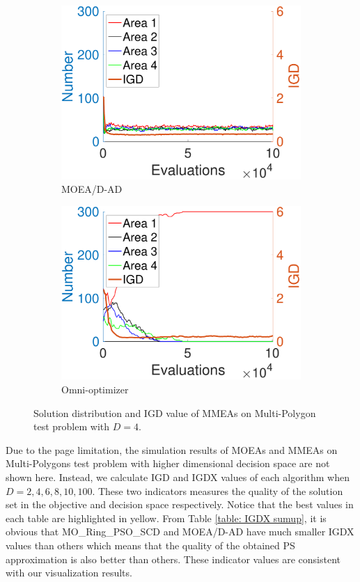 \documentclass[conference]{IEEEtran}
\begin{document}
\begin{figure}[htbp]
    \begin{subfigure}[b]{.22\textwidth}
    \includegraphics[width=\linewidth]{Section5/dim4/Diversity/MOEADAD}
    \caption{MOEA/D-AD}
    \end{subfigure}
    \begin{subfigure}[b]{.22\textwidth}
    \includegraphics[width=\linewidth]{Section5/dim4/Diversity/OmniOptimizer}
    \caption{Omni-optimizer}
    \end{subfigure}
    \caption{Solution distribution and IGD value of MMEAs on Multi-Polygon test problem with $D=4$.}
    \label{fig: MMEAs Diversity dim=4}
\end{figure}

Due to the page limitation, the simulation results of MOEAs and MMEAs on Multi-Polygons test problem with higher dimensional decision space are not shown here. Instead, we calculate IGD and IGDX\cite{Liang2016} values of each algorithm when $D=2, 4, 6, 8, 10, 100$. These two indicators measures the quality of the solution set in the objective and decision space respectively. Notice that the best values in each table are highlighted in yellow. From Table \ref{table: IGDX sumup}, it is obvious that MO\_Ring\_PSO\_SCD and MOEA/D-AD have much smaller IGDX values than others which means that the quality of the obtained PS approximation is also better than others. These indicator values are consistent with our visualization results.
\end{document}
